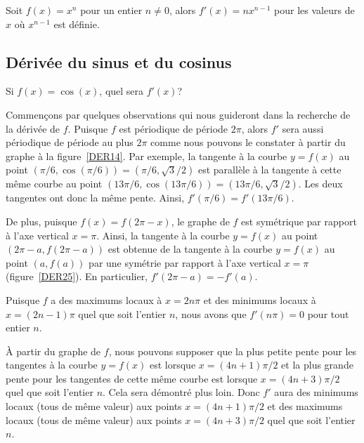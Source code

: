 {\begin{focus}{\prp}
Soit $f(x) = x^n$ pour un entier $n\neq 0$, alors $f'(x) = n x^{n-1}$
pour les valeurs de $x$ où $x^{n-1}$ est définie.
\end{focus}

\subsection{Dérivée du sinus et du cosinus \life \eng}

Si $f(x) = \cos(x)$, quel sera $f'(x)$?

Commençons par quelques observations qui nous guideront dans la
recherche de la dérivée de $f$.  Puisque $f$ est périodique de période
$2\pi$, alors $f'$ sera aussi périodique de période au plus $2\pi$
comme nous pouvons le constater à partir du graphe à la
figure~\ref{DER14}.  Par exemple, la tangente à la courbe $y = f(x)$ au point
$(\pi/6,\cos(\pi/6)) = (\pi/6,\sqrt{3}/2)$ est parallèle à la tangente
à cette même courbe au point
$(13\pi/6,\cos(13\pi/6)) = (13\pi/6,\sqrt{3}/2)$.  Les deux 
tangentes ont donc la même pente.  Ainsi, $f'(\pi/6) = f'(13\pi/6)$.


De plus, puisque $f(x) = f(2\pi-x)$, le graphe de $f$ est symétrique
par rapport à l'axe vertical $x=\pi$.  Ainsi, la tangente à la courbe
$y=f(x)$ au point $(2\pi-a,f(2\pi-a))$ est obtenue de la tangente à la
courbe $y=f(x)$ au point $(a,f(a))$ par une symétrie par rapport à
l'axe vertical $x=\pi$ (figure~\ref{DER25}).  En particulier,
$f'(2\pi-a)=-f'(a)$.

Puisque $f$ a des maximums locaux à $x=2n\pi$ et des minimums locaux à
$x = (2n-1)\pi$ quel que soit l'entier $n$, nous avons que $f'(n\pi) = 0$ 
pour tout entier $n$.


À partir du graphe de $f$, nous pouvons supposer que la plus petite pente
pour les tangentes à la courbe $y=f(x)$ est lorsque $x=(4n+1)\pi/2$ et
la plus grande pente pour les tangentes de cette même courbe est
lorsque $x=(4n+3)\pi/2$ quel que soit l'entier $n$.  Cela sera
démontré plus loin.  Donc $f'$ aura des minimums locaux (tous de même
valeur) aux points $x=(4n+1)\pi/2$ et des maximums locaux (tous de
même valeur) aux points $x=(4n+3)\pi/2$ quel que soit l'entier $n$.

}
